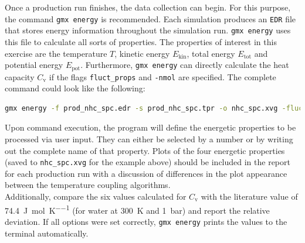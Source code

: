 \documentclass[9pt,tutorial]{livecoms}
\newcommand{\code}[1]{\colorbox{light-gray}{\texttt{#1}}}
\begin{document}
Once a production run finishes, the data collection can begin. For this purpose, the command \code{gmx energy} is recommended. Each simulation produces an \texttt{EDR} file that stores energy information throughout the simulation run. \code{gmx energy} uses this file to calculate all sorts of properties. The properties of interest in this exercise are the temperature $T$, kinetic energy $E_\text{kin}$, total energy $E_\text{tot}$ and potential energy $E_\text{pot}$. Furthermore, \code{gmx energy} can directly calculate the heat capacity $C_\text{v}$ if the flags \code{fluct\_props} and \code{-nmol} are specified. The complete command could look like the following:
\begin{lstlisting}[language=bash]
gmx energy -f prod_nhc_spc.edr -s prod_nhc_spc.tpr -o nhc_spc.xvg -fluct_props -nmol <num>
\end{lstlisting}
Upon command execution, the program will define the energetic properties to be processed via user input. They can either be selected by a number or by writing out the complete name of that property. Plots of the four energetic properties (saved to \code{nhc\_spc.xvg} for the example above) should be included in the report for each production run with a discussion of differences in the plot appearance between the temperature coupling algorithms.\\
Additionally, compare the six values calculated for $C_\text{v}$ with the literature value of \SI[per-mode=fraction]{74.4}{\joule\per\mole\per\kelvin} (for water at \SI{300}{\kelvin} and \SI{1}{\bar})\cite{EngineeringToolbox2004} and report the relative deviation. If all options were set correctly, \code{gmx energy} prints the values to the terminal automatically.
\end{document}
